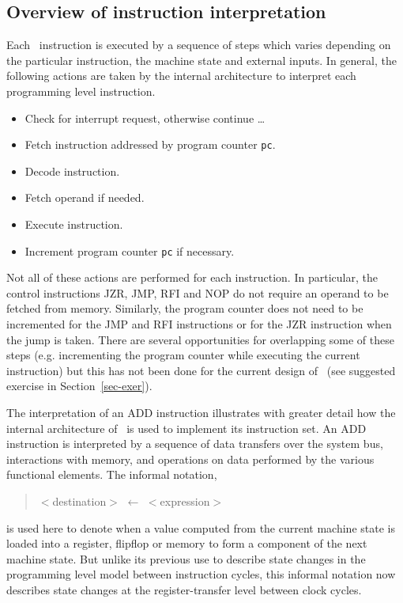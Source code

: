 \subsection{Overview of instruction interpretation}

Each \Tamarack\ instruction is executed by
a sequence of steps which varies depending on the particular
instruction, the machine state and external inputs.
In general, the following actions are taken by the internal
architecture to interpret each programming level instruction.

\begin{itemize}
\item Check for interrupt request, otherwise continue \dots
\item Fetch instruction addressed by program counter \verb"pc".
\item Decode instruction.
\item Fetch operand if needed.
\item Execute instruction.
\item Increment program counter \verb"pc" if necessary.
\end{itemize}

Not all of these actions are performed for each instruction.
In particular, the control instructions JZR, JMP, RFI and NOP
do not require an operand to be fetched from memory.
Similarly, the program counter does not need to be incremented
for the JMP and RFI instructions or for the
JZR instruction when the jump is taken.
There are several opportunities for overlapping some of these
steps (e.g. incrementing the program counter while executing
the current instruction) but this has not been done for the
current design of \Tamarack\
(see suggested exercise in Section~\ref{sec-exer}).

The interpretation of an ADD instruction illustrates with greater detail how
the internal architecture of \Tamarack\
is used to implement its instruction set.
An ADD instruction is interpreted by a sequence of data transfers
over the system bus, interactions with memory, and operations
on data performed by the various functional elements.
The informal notation,

\begin{quote}
$<$destination$>$ $\leftarrow$ $<$expression$>$
\end{quote}

\noindent
is used here
to denote when a value computed from the current machine state
is loaded into a register, flipflop or memory to form a component of the
next machine state.
But unlike its previous use
to describe state changes in the programming level model
between instruction cycles,
this informal notation now describes state changes
at the register-transfer level
between clock cycles.

